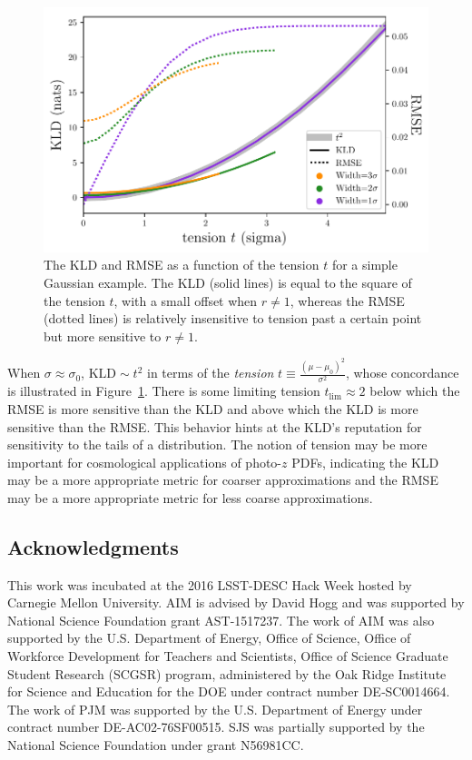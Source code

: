 \documentclass[\docopts]{\docclass}
\newcommand{\pz}{photo-$z$ PDF}
\begin{document}
\begin{figure}
  \begin{center}
    \includegraphics[width=\columnwidth]{figures/tension.pdf}
    \caption{The KLD and RMSE as a function of the tension $t$ for a simple 
Gaussian example.
    The KLD (solid lines) is equal to the square of the tension $t$, with a 
small offset when $r\neq1$, whereas the RMSE (dotted lines) is relatively 
insensitive to tension past a certain point but more sensitive to $r\neq1$.
    \label{fig:tension}}
  \end{center}
\end{figure}

When $\sigma\approx\sigma_{0}$, $\mathrm{KLD}\sim t^{2}$ in terms of the 
\textit{tension} $t\equiv\frac{(\mu-\mu_{0})^{2}}{\sigma^{2}}$, whose 
concordance is illustrated in Figure~\ref{fig:tension}.
There is some limiting tension $t_{\mathrm{lim}}\approx2$ below which the RMSE 
is more sensitive than the KLD and above which the KLD is more sensitive than 
the RMSE.
This behavior hints at the KLD's reputation for sensitivity to the tails of a 
distribution.
The notion of tension may be more important for cosmological applications of 
\pz s, indicating the KLD may be a more appropriate metric for coarser 
approximations and the RMSE may be a more appropriate metric for less coarse 
approximations.

\subsection*{Acknowledgments}


This work was incubated at the 2016 LSST-DESC Hack Week hosted by Carnegie 
Mellon University.
AIM is advised by David Hogg and was supported by National Science Foundation 
grant AST-1517237.
The work of AIM was also supported by the U.S. Department of Energy, Office of 
Science, Office of Workforce Development for Teachers and Scientists, Office of 
Science Graduate Student Research (SCGSR) program, administered by the Oak 
Ridge Institute for Science and Education for the DOE under contract number 
DE‐SC0014664.
The work of PJM was supported by the U.S. Department of Energy under contract 
number DE-AC02-76SF00515.
SJS was partially supported by the National Science Foundation under grant 
N56981CC.
\end{document}
